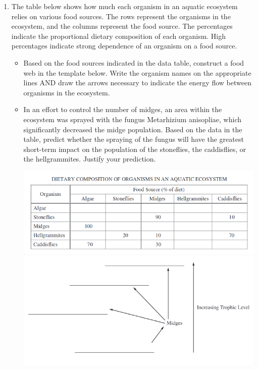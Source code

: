 \documentclass{article}
\begin{document}
\begin{enumerate}
\item The table below shows how much each organism in an aquatic ecosystem relies on 
various food sources. The rows represent the organisms in the ecosystem, and the columns 
represent the food source. The percentages indicate the proportional dietary composition of each organism. High percentages indicate 
strong dependence of an organism on a food source.
\begin{itemize}
\item Based on the food sources indicated in the data table, construct a food web in the template below. Write  
the organism names on the appropriate lines AND draw the arrows necessary to indicate the 
energy flow between organisms in the ecosystem. 
\item In an effort to control the number of midges, an area within the ecosystem was 
sprayed with the fungus Metarhizium anisopliae, which significantly decreased the midge 
population. Based on the data in the table, predict whether the spraying of the fungus will have the greatest short-term impact on the 
population of the stoneflies, the caddisflies, or the hellgrammites. Justify your prediction. 
\begin{center}
\includegraphics[scale=0.5]{table}
\includegraphics[scale=0.5]{foodweb}
\end{center}
\end{itemize}
\end{enumerate}
\end{document}
